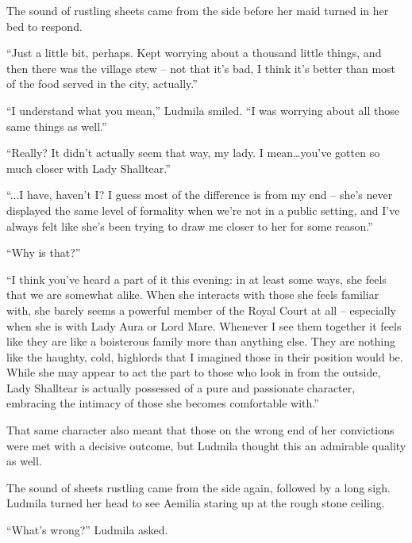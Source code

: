 

The sound of rustling sheets came from the side before her maid turned in her bed to respond.

 

“Just a little bit, perhaps. Kept worrying about a thousand little things, and then there was the village stew – not that it’s bad, I think it’s better than most of the food served in the city, actually.”

 

“I understand what you mean,” Ludmila smiled. “I was worrying about all those same things as well.”

 

“Really? It didn’t actually seem that way, my lady. I mean…you’ve gotten so much closer with Lady Shalltear.”

 

“...I have, haven’t I? I guess most of the difference is from my end – she’s never displayed the same level of formality when we’re not in a public setting, and I’ve always felt like she’s been trying to draw me closer to her for some reason.”

 

“Why is that?”

 

“I think you’ve heard a part of it this evening: in at least some ways, she feels that we are somewhat alike. When she interacts with those she feels familiar with, she barely seems a powerful member of the Royal Court at all – especially when she is with Lady Aura or Lord Mare. Whenever I see them together it feels like they are like a boisterous family more than anything else. They are nothing like the haughty, cold, highlords that I imagined those in their position would be. While she may appear to act the part to those who look in from the outside, Lady Shalltear is actually possessed of a pure and passionate character, embracing the intimacy of those she becomes comfortable with.”

 

That same character also meant that those on the wrong end of her convictions were met with a decisive outcome, but Ludmila thought this an admirable quality as well.

 

The sound of sheets rustling came from the side again, followed by a long sigh. Ludmila turned her head to see Aemilia staring up at the rough stone ceiling.

 

“What’s wrong?” Ludmila asked.

